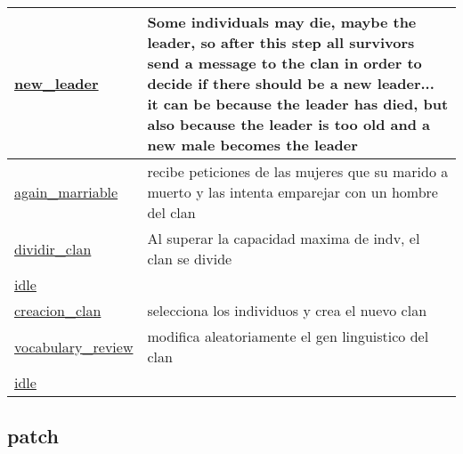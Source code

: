 \documentclass[a4paper,11pt]{article}
\begin{document}
\begin{longtable}[H!]{ll}
\midrule
\parbox{5cm}{\url{new_leader}}  & \parbox{10cm}{Some individuals may die, maybe the leader, so after this step all survivors send a message to the clan in order to decide if there should be a new leader... it can be because the leader has died, but also because the leader is too old and a new male becomes the leader} \\
\midrule
\parbox{5cm}{\url{again_marriable}}  & \parbox{10cm}{recibe peticiones de las mujeres que su marido a muerto y las intenta emparejar con un hombre del clan} \\
\midrule
\parbox{5cm}{\url{dividir_clan}}  & \parbox{10cm}{Al superar la capacidad maxima de indv, el clan se divide} \\
\midrule
\parbox{5cm}{\url{idle}}  & \parbox{10cm}{} \\
\midrule
\parbox{5cm}{\url{creacion_clan}}  & \parbox{10cm}{selecciona los individuos y crea el nuevo clan} \\
\midrule
\parbox{5cm}{\url{vocabulary_review}}  & \parbox{10cm}{modifica aleatoriamente el gen linguistico del clan} \\
\midrule
\parbox{5cm}{\url{idle}}  & \parbox{10cm}{} \\
\end{longtable}

\subsection{patch}
\end{document}
